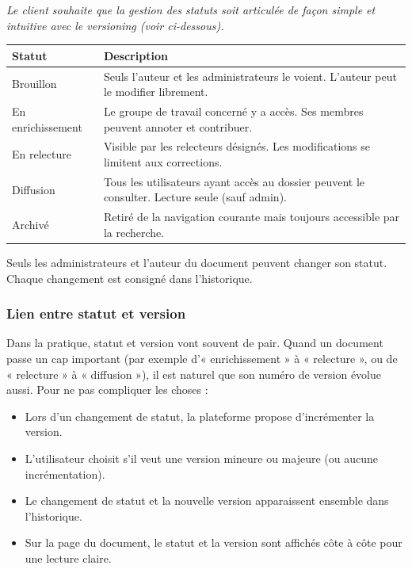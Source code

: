 \documentclass[a4paper,12pt,french]{article}
\begin{document}
\textit{Le client souhaite que la gestion des statuts soit articulée de façon simple et intuitive avec le versioning (voir ci-dessous).}

\begin{tabularx}{\textwidth}{l X}
\toprule
\textbf{Statut} & \textbf{Description} \\
\midrule
Brouillon & Seuls l'auteur et les administrateurs le voient. L'auteur peut le modifier librement. \\
\addlinespace
En enrichissement & Le groupe de travail concerné y a accès. Ses membres peuvent annoter et contribuer. \\
\addlinespace
En relecture & Visible par les relecteurs désignés. Les modifications se limitent aux corrections. \\
\addlinespace
Diffusion & Tous les utilisateurs ayant accès au dossier peuvent le consulter. Lecture seule (sauf admin). \\
\addlinespace
Archivé & Retiré de la navigation courante mais toujours accessible par la recherche. \\
\bottomrule
\end{tabularx}

\vspace{0.5em}
Seuls les administrateurs et l'auteur du document peuvent changer son statut. Chaque changement est consigné dans l'historique.

\subsubsection{Lien entre statut et version}

Dans la pratique, statut et version vont souvent de pair. Quand un document passe un cap important (par exemple d'« enrichissement » à « relecture », ou de « relecture » à « diffusion »), il est naturel que son numéro de version évolue aussi. Pour ne pas compliquer les choses :

\begin{itemize}[leftmargin=1.5em]
  \item Lors d'un changement de statut, la plateforme propose d'incrémenter la version.
  \item L'utilisateur choisit s'il veut une version mineure ou majeure (ou aucune incrémentation).
  \item Le changement de statut et la nouvelle version apparaissent ensemble dans l'historique.
  \item Sur la page du document, le statut et la version sont affichés côte à côte pour une lecture claire.
\end{itemize}
\end{document}
